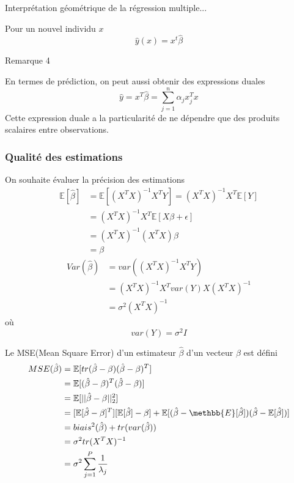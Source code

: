 \documentclass{article}
\begin{document}
Interpr\'etation g\'eom\'etrique de la r\'egression multiple...

Pour un nouvel individu $x$
\begin{equation}
\hat{y}(x)=x^t\hat{\beta}
\end{equation}

Remarque 4

En termes de pr\'ediction, on peut aussi obtenir des expressions duales
\begin{equation}
\hat{y}=x^T\hat{\beta}=\sum_{j=1}^n\alpha_jx^T_jx
\end{equation}
Cette expression duale a la particularit\'e de ne d\'ependre que des produits scalaires entre observations.  

\subsubsection{Qualit\'e des estimations}
On souhaite \'evaluer la pr\'ecision des estimations
\begin{equation}
\begin{split}
\mathbb{E}[\hat{\beta}]&=\mathbb{E}[(X^TX)^{-1}X^TY]=(X^TX)^{-1}X^T\mathbb{E}[Y]\\
&=(X^TX)^{-1}X^T\mathbb{E}[X\beta+\epsilon]\\
&=(X^TX)^{-1}(X^TX)\beta\\
&=\beta
\end{split}
\end{equation}
\begin{equation}
\begin{split}
Var(\hat{\beta})&=var((X^TX)^{-1}X^TY)\\
&=(X^TX)^{-1}X^{T} var(Y) X(X^TX)^{-1}\\
&=\sigma^2 (X^TX)^{-1}
\end{split}
\end{equation}
o\`u
\begin{equation}
var(Y)=\sigma^2I
\end{equation}

Le MSE(Mean Square Error) d'un estimateur $\hat{\beta}$ d'un vecteur $\beta$ est d\'efini
\begin{equation}
\begin{split}
MSE(\hat{\beta})&=\mathbb{E}[tr(\hat{\beta}-\beta)(\hat{\beta}-\beta)^T]\\
&=\mathbb{E}[(\hat{\beta}-\beta)^T(\hat{\beta}-\beta)]\\
&=\mathbb{E}[||\hat{\beta}-\beta||_2^2]\\
&=[\mathbb{E}[\hat{\beta}-\beta]^T][\mathbb{E}[\hat{\beta}]-\beta]+\mathbb{E}[(\hat{\beta}-\methbb{E}[\hat{\beta}])(\hat{\beta}-\mathbb{E}[\hat{\beta}])]\\
&=biais^2(\hat{\beta})+ tr(var(\hat{\beta}))\\
&=\sigma^2tr(X^TX)^{-1}\\
&=\sigma^2\sum_{j=1}^{P}\frac{1}{\lambda_j}
\end{split}
\end{equation}
\end{document}
